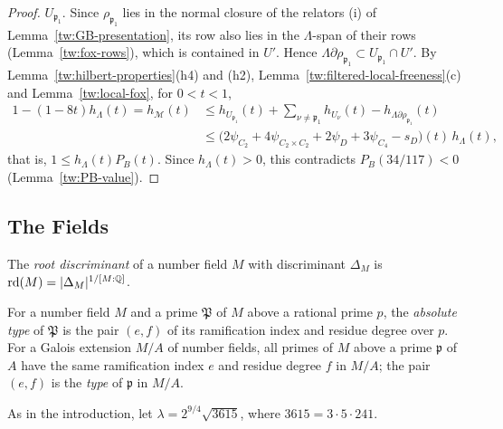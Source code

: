 \begin{proof}
$U_{\mathfrak p_1}$. Since $\rho_{\mathfrak p_1}$ lies in the normal closure of
the relators (i) of Lemma~\ref{tw:GB-presentation}, its row also lies in the
$\Lambda$-span of their rows (Lemma~\ref{tw:fox-rows}), which is contained in
$U'$. Hence $\Lambda\partial\rho_{\mathfrak p_1}\subset U_{\mathfrak p_1}\cap U'$.
By Lemma~\ref{tw:hilbert-properties}(h4) and (h2),
Lemma~\ref{tw:filtered-local-freeness}(c) and Lemma~\ref{tw:local-fox}, for
$0<t<1$,
\begin{align*}
 1-(1-8t)h_\Lambda(t)=h_{\mathcal M}(t)
 &\le h_{U_{\mathfrak p_1}}(t)+\sum_{\nu\ne\mathfrak p_1}h_{U_\nu}(t)
 -h_{\Lambda\partial\rho_{\mathfrak p_1}}(t)\\
 &\le\bigl(2\psi_{C_2}+4\psi_{C_2\times C_2}+2\psi_D+3\psi_{C_4}-s_D\bigr)(t)
 \,h_\Lambda(t),
\end{align*}
that is, $1\le h_\Lambda(t)P_B(t)$. Since $h_\Lambda(t)>0$, this contradicts
$P_B(34/117)<0$ (Lemma~\ref{tw:PB-value}).
\end{proof}

\subsection{The Fields}\label{tw:fields-section}

\begin{definition}\label{tw:rd}
The \emph{root discriminant} of a number field $M$ with discriminant
$\Delta_M$ is $\operatorname{rd}(M)=|\Delta_M|^{1/[M:\mathbb Q]}$.
\end{definition}

\begin{definition}\label{tw:type}
For a number field $M$ and a prime $\mathfrak P$ of $M$ above a rational
prime $p$, the \emph{absolute type} of $\mathfrak P$ is the pair $(e,f)$ of
its ramification index and residue degree over $p$. For a Galois extension
$M/A$ of number fields, all primes of $M$ above a prime $\mathfrak p$ of $A$
have the same ramification index $e$ and residue degree $f$ in $M/A$; the
pair $(e,f)$ is the \emph{type} of $\mathfrak p$ in $M/A$.
\end{definition}

As in the introduction, let $\lambda=2^{9/4}\sqrt{3615}$, where
$3615=3\cdot5\cdot241$.

